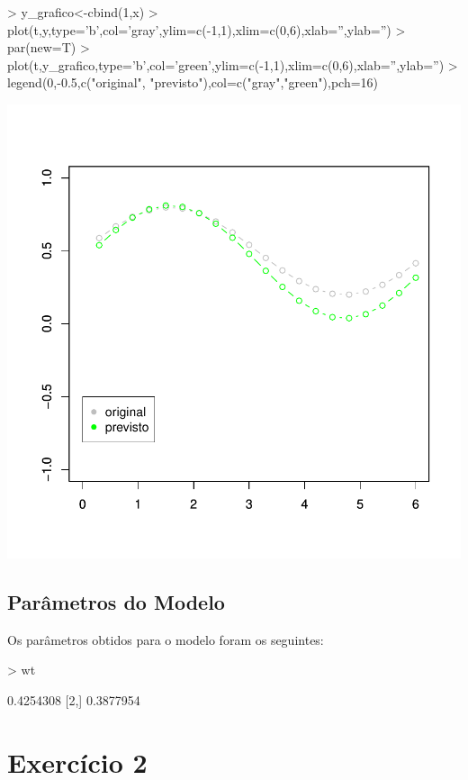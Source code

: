 \documentclass{article}
\begin{document}
\begin{Schunk}
\begin{Sinput}
>   y_grafico<-cbind(1,x) %
>   plot(t,y,type='b',col='gray',ylim=c(-1,1),xlim=c(0,6),xlab='',ylab='')
>   par(new=T)
>   plot(t,y_grafico,type='b',col='green',ylim=c(-1,1),xlim=c(0,6),xlab='',ylab='')
>   legend(0,-0.5,c("original", "previsto"),col=c("gray","green"),pch=16)
\end{Sinput}
\end{Schunk}
\includegraphics{adaline-echoT}

\subsection{Parâmetros do Modelo}

Os parâmetros obtidos para o modelo foram os seguintes:

\begin{Schunk}
\begin{Sinput}
>   wt
\end{Sinput}
\begin{Soutput}
          [,1]
[1,] 0.4254308
[2,] 0.3877954
\end{Soutput}
\end{Schunk}

\section{Exercício 2}
\end{document}

